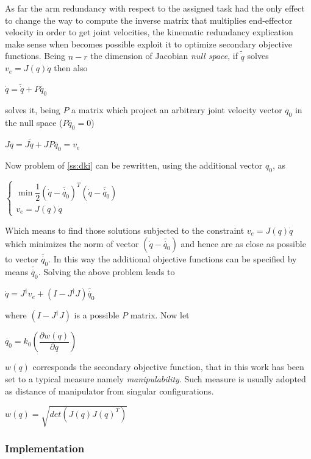 As far the arm redundancy with respect to the assigned task had the only effect to change the way to compute the inverse matrix that multiplies end-effector velocity in order to get joint velocities, the kinematic redundancy explication make sense when becomes possible exploit it to optimize secondary objective functions. Being $n-r$ the dimension of Jacobian \textit{null space}, if $\tilde{\dot{q}}$ solves $v_e = J(q)\dot{q}$ then also
\begin{center}
	$\dot{q} = \tilde{\dot{q}} + P\dot{q_0}$
\end{center}
solves it, being $P$ a matrix which project an arbitrary joint velocity vector $\dot{q_0}$ in the null space ($P\dot{q_0}=0$)
\begin{center}
	$J\dot{q} = J\tilde{\dot{q}} + JP\dot{q_0} = v_e$
\end{center}
Now problem of \ref{ss:dki} can be rewritten, using the additional vector $q_0$, as
\begin{center}
	$\begin{cases}
	\min \dfrac{1}{2}(\dot{q} - \tilde{\dot{q_0}})^T(\dot{q} - \tilde{\dot{q_0}})\\
	v_e = J(q)\dot{q}
	\end{cases}$
\end{center}
Which means to find those solutions subjected to the constraint $v_e = J(q)\dot{q}$ which minimizes the norm of vector $(\dot{q} - \tilde{\dot{q_0}})$ and hence are as close as possible to vector $\tilde{\dot{q_0}}$. In this way the additional objective functions can be specified by means $\tilde{\dot{q_0}}$. Solving the above problem leads to 
\begin{center}
	$\dot{q} = J^\dagger v_e + (I-J^\dagger J)\tilde{\dot{q_0}}$
\end{center}
where $(I-J^\dagger J)$ is a possible $P$ matrix. Now let 
\begin{center}
	$\dot{q_0} = k_0\left(\dfrac{\partial w(q)}{\partial q}\right)$
\end{center}
$w(q)$ corresponds the secondary objective function, that in this work has been set to a typical measure namely \textit{manipulability}. Such measure is usually adopted as distance of manipulator from singular configurations. 
\begin{center}
$w(q) = \sqrt{det(J(q)J(q)^T)}$
\end{center}

\subsubsection{Implementation}

